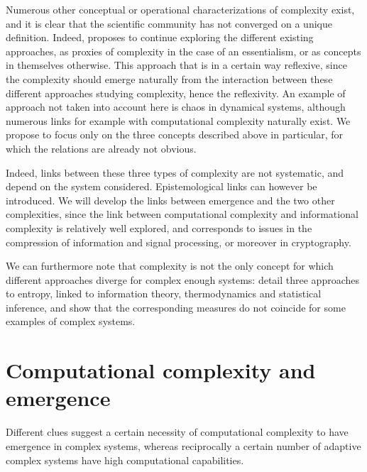 \documentclass[graybox]{svmult}
\begin{document}
Numerous other conceptual or operational characterizations of complexity exist, and it is clear that the scientific community has not converged on a unique definition. Indeed, \cite{chu2008criteria} proposes to continue exploring the different existing approaches, as proxies of complexity in the case of an essentialism, or as concepts in themselves otherwise. This approach that is in a certain way reflexive, since the complexity should emerge naturally from the interaction between these different approaches studying complexity, hence the reflexivity. An example of approach not taken into account here is chaos in dynamical systems, although numerous links for example with computational complexity \cite{PROKOPENKO2019} naturally exist. We propose to focus only on the three concepts described above in particular, for which the relations are already not obvious.



Indeed, links between these three types of complexity are not systematic, and depend on the system considered. Epistemological links can however be introduced. We will develop the links between emergence and the two other complexities, since the link between computational complexity and informational complexity is relatively well explored, and corresponds to issues in the compression of information and signal processing, or moreover in cryptography.


We can furthermore note that complexity is not the only concept for which different approaches diverge for complex enough systems: \cite{thurner2017three} detail three approaches to entropy, linked to information theory, thermodynamics and statistical inference, and show that the corresponding measures do not coincide for some examples of complex systems.



\section{Computational complexity and emergence}

Different clues suggest a certain necessity of computational complexity to have emergence in complex systems, whereas reciprocally a certain number of adaptive complex systems have high computational capabilities.
\end{document}
